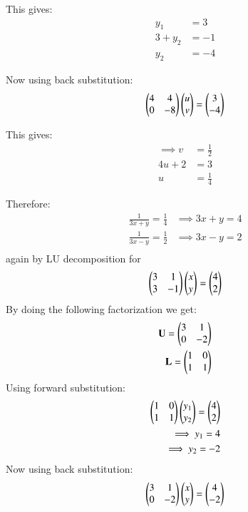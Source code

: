 \documentclass[journal]{IEEEtran}
\begin{document}
This gives:
\begin{align}
    y_1 &= 3\\
    3 + y_2 &= -1\\
    y_2 &= -4
\end{align}

Now using back substitution:
\begin{align}
    \begin{pmatrix}4 & 4\\0 & -8\end{pmatrix}\begin{pmatrix}u\\v\end{pmatrix} = \begin{pmatrix}3\\ -4\end{pmatrix}
\end{align}

This gives:
\begin{align}
      \implies v&=\frac{1}{2}\\
    4u + 2 &= 3\\
    u &= \frac{1}{4}
\end{align}

Therefore:
\begin{align}
    \frac{1}{3x+y} =\frac{1}{4} &\implies 3x+y=4\\
    \frac{1}{3x-y} = \frac{1}{2} &\implies 3x-y =2\\
\end{align}
again by LU decomposition for 
\begin{align}
    \begin{pmatrix}3 & 1 \\ 3& -1\end{pmatrix}\begin{pmatrix}x\\y\end{pmatrix} = \begin{pmatrix}4\\2\end{pmatrix}
\end{align}
By doing the following factorization we get:
\begin{align}
	\mathbf{U}=\begin{pmatrix}3 & 1\\0 & -2\end{pmatrix} \\
	\mathbf{ L} = \begin{pmatrix}1 & 0\\ 1 & 1\end{pmatrix}
\end{align}
Using forward substitution:
\begin{align}
    \begin{pmatrix}1 & 0\\ 1 & 1\end{pmatrix}\begin{pmatrix}y_1\\y_2\end{pmatrix} = \begin{pmatrix}4\\2\end{pmatrix}\\
    \implies y_1 =4\\
    \implies y_2 =-2
\end{align}
Now using back substitution:
\begin{align}
    \begin{pmatrix}3 & 1\\0 & -2\end{pmatrix}\begin{pmatrix}x\\y\end{pmatrix} = \begin{pmatrix}4\\ -2\end{pmatrix}
\end{align}
\end{document}
